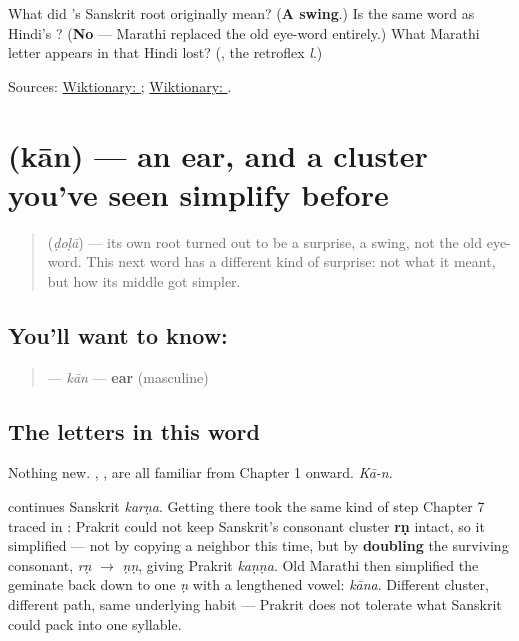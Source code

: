 \begin{tcolorbox}[breakable,colback=teal!4,colframe=teal!35!black,title={Before you move on}]
What did \textbf{}'s Sanskrit root originally mean? (\textbf{A swing}.) Is \textbf{} the same word as Hindi's \textbf{}? (\textbf{No} — Marathi replaced the old eye-word entirely.) What Marathi letter appears in \textbf{} that Hindi lost? (\textbf{}, the retroflex \emph{l}.)

Sources: \href{https://en.wiktionary.org/wiki/\%E0\%A4\%A1\%E0\%A5\%8B\%E0\%A4\%B3\%E0\%A4\%BE}{Wiktionary: }; \href{https://en.wiktionary.org/wiki/\%E0\%A4\%A6\%E0\%A5\%8B\%E0\%A4\%B2}{Wiktionary: }.
\end{tcolorbox}
\section[kān]{ (kān) — an ear, and a cluster you've seen simplify before}

\label{lesson:MR-C12-kaan}



\begin{quote}
\textbf{} (\emph{ḍoḷā}) — its own root turned out to be a surprise, a swing, not the old eye-word. This next word has a different kind of surprise: not what it meant, but how its middle got simpler.
\end{quote}

\subsection*{You'll want to know: }
\begin{quote}
\textbf{} — \emph{kān} — \textbf{ear} (masculine)
\end{quote}

\subsection*{The letters in this word}
Nothing new. \textbf{}, \textbf{}, \textbf{} are all familiar from Chapter 1 onward. \emph{Kā-n}.

\begin{sounds}
\textbf{} continues Sanskrit \textbf{} \emph{karṇa}. Getting there took the same kind of step Chapter 7 traced in \textbf{}: Prakrit could not keep Sanskrit's consonant cluster \textbf{rṇ} intact, so it simplified — not by copying a neighbor this time, but by \textbf{doubling} the surviving consonant, \emph{rṇ} $\to$ \emph{ṇṇ}, giving Prakrit \textbf{} \emph{kaṇṇa}. Old Marathi then simplified the geminate back down to one \emph{ṇ} with a lengthened vowel: \emph{kāna}. Different cluster, different path, same underlying habit — Prakrit does not tolerate what Sanskrit could pack into one syllable.
\end{sounds}

